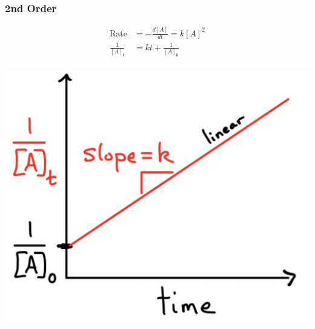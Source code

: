     \subsubsection{2nd Order}
        \begin{minipage}{0.99\linewidth}
            \begin{minipage}{0.65\linewidth}
                \begin{align*}
                    \text{Rate} &= -\frac{d[A]}{d t} = k[A]^2 \\
                    \frac{1}{[A]_t} &= k t + \frac{1}{[A]_0} \\
                \end{align*}
            \end{minipage}
            \begin{minipage}{0.34\linewidth}
                \includegraphics[width=0.9\linewidth]{src/7_Kinetics/images/2nd_order.pdf}
            \end{minipage}
        \end{minipage}


